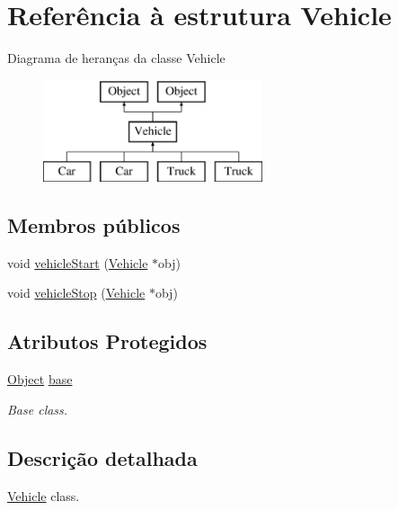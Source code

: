 \hypertarget{struct_vehicle}{\section{Referência à estrutura Vehicle}
\label{struct_vehicle}
}
Diagrama de heranças da classe Vehicle\begin{figure}[H]
\begin{center}
\leavevmode
\includegraphics[height=3.000000cm]{struct_vehicle}
\end{center}
\end{figure}
\subsection*{Membros públicos}
\begin{DoxyCompactItemize}
\item 
void \hyperlink{struct_vehicle_a6891d3d28853bc3fdd075596dc6de9f8}{vehicle\-Start} (\hyperlink{struct_vehicle}{Vehicle} $\ast$obj)
\item 
void \hyperlink{struct_vehicle_a4dcbcba43792dcd673a552b14479ab77}{vehicle\-Stop} (\hyperlink{struct_vehicle}{Vehicle} $\ast$obj)
\end{DoxyCompactItemize}
\subsection*{Atributos Protegidos}
\begin{DoxyCompactItemize}
\item 
\hypertarget{struct_vehicle_a23cf4ef56ba22bed625eab08d6361fa7}{\hyperlink{struct_object}{Object} \hyperlink{struct_vehicle_a23cf4ef56ba22bed625eab08d6361fa7}{base}}\label{struct_vehicle_a23cf4ef56ba22bed625eab08d6361fa7}

\begin{DoxyCompactList}\small\item\em Base class. \end{DoxyCompactList}\end{DoxyCompactItemize}


\subsection{Descrição detalhada}
\hyperlink{struct_vehicle}{Vehicle} class. 

